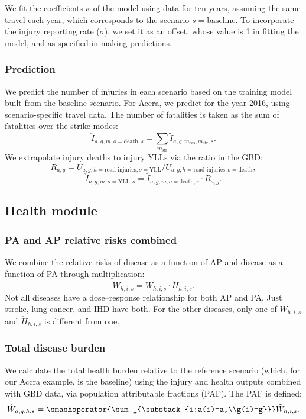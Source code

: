 \documentclass{article}
\begin{document}
We fit the coefficients $\kappa$ of the model using data for ten years, assuming the same travel each year, which corresponds to the scenario $s=\text{baseline}$. To incorporate the injury reporting rate ($\sigma$), we set it as an offset, whose value is 1 in fitting the model, and as specified in making predictions. %

\subsubsection{Prediction}

We predict the number of injuries in each scenario based on the training model built from the baseline scenario. For Accra, we predict for the year 2016, using scenario-specific travel data.
The number of fatalities is taken as the sum of fatalities over the strike modes:
$$\check{I}_{a,g,m,o=\text{death},s}=\sum_{m_{\text{str}}}\tilde{I}_{a,g,m_{\text{cas}},m_{\text{str}},s}.$$
We extrapolate injury deaths to injury YLLs via the ratio in the GBD:
$$R_{a,g}=U_{a,g,h=\text{road injuries},o=\text{YLL}}/U_{a,g,h=\text{road injuries},o=\text{death}},$$
$$\check{I}_{a,g,m,o=\text{YLL},s}=\check{I}_{a,g,m,o=\text{death},s}\cdot R_{a,g}. $$
  
\subsection{Health module}
\subsubsection{PA and AP relative risks combined}

  We combine the relative risks of disease as a function of AP and disease as a function of PA through multiplication:
  $$\tilde{W}_{h,i,s}=W_{h,i,s}\cdot\check{H}_{h,i,s}. $$
  Not all diseases have a dose--response relationship for both AP and PA. Just stroke, lung cancer, and IHD have both. For the other diseases, only one of $W_{h,i,s}$ and $\check{H}_{h,i,s}$ is different from one.
  
  \subsubsection{Total disease burden}

We calculate the total health burden relative to the reference scenario (which, for our Accra example, is the baseline) using the injury and health outputs combined with GBD data, via population attributable fractions (PAF). The PAF is defined:
$$\hat{W}_{a,g,h,s}=\smashoperator{\sum_{\substack{i:a(i)=a,\\g(i)=g}}}\tilde{W}_{h,i,s}.$$
\end{document}
